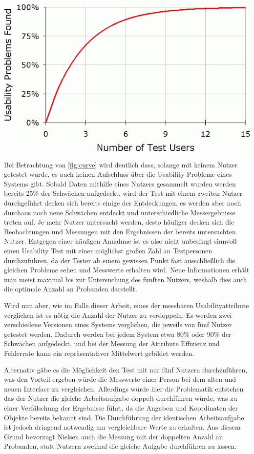 \begin{center}
  \includegraphics[width=0.7\linewidth]{figures/curve1.png}
  \label{fig:curve}
\end{center}

Bei Betrachtung von \ref{fig:curve} wird deutlich dass, solange mit keinem Nutzer getestet wurde, es auch keinen Aufschluss über die Usability Probleme eines Systems gibt.
Sobald Daten mithilfe eines Nutzers gesammelt wurden werden bereits 25\% der Schwächen aufgedeckt, wird der Test mit einem zweiten Nutzer durchgeführt decken sich bereits einige der Entdeckungen, es werden aber noch durchaus noch neue Schwächen entdeckt und unterschiedliche Messergebnisse treten auf.
Je mehr Nutzer untersucht werden, desto häufiger decken sich die Beobachtungen und Messungen mit den Ergebnissen der bereits untersuchten Nutzer.\cite{.h}
Entgegen einer häufigen Annahme ist es also nicht unbedingt sinnvoll einen Usability Test mit einer möglichst großen Zahl an Testpersonen durchzuführen, da der Tester ab einem gewissen Punkt fast ausschließlich die gleichen Probleme sehen und Messwerte erhalten wird.
Neue Informationen erhält man meist maximal bis zur Untersuchung des fünften Nutzers, weshalb dies auch die optimale Anzahl an Probanden darstellt.

Wird nun aber, wie im Falle dieser Arbeit, eines der messbaren Usabilityattribute verglichen ist es nötig die Anzahl der Nutzer zu verdoppeln.
Es werden zwei verschiedene Versionen eines Systems verglichen, die jeweils von fünf Nutzer getestet werden.
Dadurch werden bei jedem System etwa 80\% oder 90\% der Schwächen aufgedeckt, und bei der Messung der Attribute Effizienz und Fehlerrate kann ein repräsentativer Mittelwert gebildet werden.

Alternativ gäbe es die Möglichkeit den Test mit nur fünf Nutzern durchzuführen, was den Vorteil ergeben würde die Messwerte einer Person bei dem alten und neuen Interface zu vergleichen.
Allerdings würde hier die Problematik entstehen das der Nutzer die gleiche Arbeitsaufgabe doppelt durchführen würde, was zu einer Verfälschung der Ergebnisse führt, da die Angaben und Koordinaten der Objekte bereits bekannt sind.
Die Durchführung der identischen Arbeitsaufgabe ist jedoch dringend notwendig um vergleichbare Werte zu erhalten.
Aus diesem Grund bevorzugt Nielsen auch die Messung mit der doppelten Anzahl an Probanden, statt Nutzern zweimal die gleiche Aufgabe durchführen zu lassen.\cite{.h}

